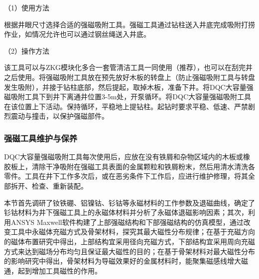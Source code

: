 （1）使用方法

根据井眼尺寸选择合适的强磁吸附工具。强磁工具通过钻柱送入井底完成吸附打捞作业，如情况允许也可以通过钢丝绳送入井底。

（2）操作方法

该工具可以与ZKG模块化多合一套管清洁工具一同使用（推荐），也可以在刮完井之后使用。将强磁吸附工具放在预先放好木板的转盘上（防止强磁吸附工具与转盘发生吸附），并接于钻柱底部，然后提起，取掉木板，准备下井。将DQC大容量强磁吸附工具下到井下离通井位置3-5m处，开泵循环。将DQC大容量强磁吸附工具在该位置上下活动。保持循环，平稳地上提钻柱。起钻时要求平稳、低速、严禁剧烈震动与撞击，以保护强磁部件。

\subsubsection{强磁工具维护与保养}

DQC大容量强磁吸附工具每次使用后，应放在没有铁屑和杂物区域内的木板或橡胶板上，清除干净吸附在强磁工具表面的金属颗粒和铁屑粉末，然后用清水清洗各零件。工具在井下工作多次后，或在恶劣条件下工作后，应进行维护修理，将其全部拆开、检查、重新装配。



本节首先调研了钕铁硼、铝镍钴、钐钴等永磁材料的工作参数及退磁曲线，确定了钐钴材料为井下强磁工具上的永磁体材料并分析了永磁体退磁影响因素；其次，利用ANSYS Maxwell软件构建了上部强磁结构和下部强磁结构的仿真模型，通过改变工具中永磁体充磁方式及骨架材料，探究其最大磁性分布规律；在基于充磁方向的磁体布置研究中得出，上部结构宜采用径向充磁方式，下部结构宜采用周向充磁方式来达到磁场分布均匀且保证最大磁性的目的；在基于骨架材料对最大磁性分布的影响研究中得出，骨架材料为导磁效果好的金属材料时，能聚集磁感线增大磁通，起到增加工具磁性的作用。


































































